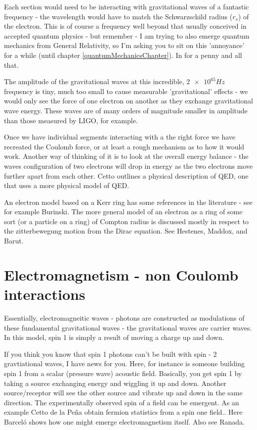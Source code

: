 \documentclass[../rzero]{subfiles}
\begin{document}
 Each section would need to be interacting with gravitational waves of a fantastic frequency - the wavelength would have to match the Schwarzschild radius ($r_s$) of the electron. This is of course a frequency well beyond that usually conceived in accepted quantum physics - but remember - I am trying to also emerge quantum mechanics from General Relativity, so I'm asking you to sit on this 'annoyance' for a while (until chapter \ref{quantumMechanicsChapter}).  In for a penny and all that.
 
 The amplitude of the gravitational waves at this incredible, $\num{2e65} Hz$ frequency is tiny, much too small to cause measurable 'gravitational' effects - we would only see the force of one electron on another as they exchange gravitational wave energy. These waves are of many orders of magnitude smaller in amplitude than those measured by LIGO, for example.
 
 Once we have individual segments interacting with a the right force we have recreated the Coulomb force, or at least a rough mechanism as to how it would work. Another way of thinking of it is to look at the overall energy balance - the waves configuration of two electrons will drop in energy as the two electrons move further apart from each other. Cetto\cite{Cetto2013} outlines a physical description of QED, one that uses a more physical model of QED. 
  
 An electron model based on a Kerr ring has some references in the literature - see for example Burinski\cite{Burinskii2012}. The more general model of an electron as a ring of some sort (or a particle on a ring) of Compton radius is discussed mostly in respect to the zitterbewegung motion from the Dirac equation. See Hestenes\cite{Hestenes1990}, Maddox\cite{Maddox1987}, and Barut\cite{Barut1984}.
 
 \section{Electromagnetism - non Coulomb interactions} 
 Essentially, electromagneitic waves - photons are constructed as modulations of these fundamental gravitational waves - the gravitational waves are carrier waves. In this model, spin 1 is simply a result of moving a charge up and down. 
 
 If you think you know that spin 1 photons can't be built with spin - 2 gravtiational waves, I have news for you. Here, for instance is someone\cite{shiObservationAcousticSpin2019} building spin 1 from a scalar (pressure wave) acoustic field. Basically, you get spin 1 by taking a source exchanging energy and wiggling it up and down. Another source/receptor will see the other source and vibrate up and down in the same direction. The experimentally observed spin of a field can be emergent. As an example Cetto de la Peña obtain fermion statistics from a spin one field.\cite{cettoElectronSystemCorrelated2016}. Here Barceló\cite{barceloElectromagnetismEmergentPhenomenon2014} shows how one might emerge electromagnetism itself. Also see Ranada\cite{ranadaTopologicalTheoryElectromagnetic1989}.
 
\end{document}
